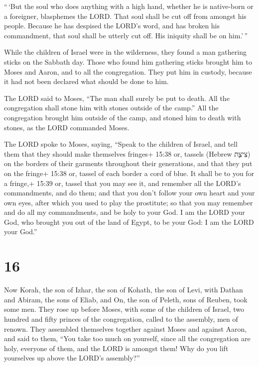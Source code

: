  ``\,`But the soul who does anything with a high hand,
whether he is native-born or a foreigner, blasphemes the LORD. That soul
shall be cut off from amongst his people.  Because he has
despised the LORD's word, and has broken his commandment, that soul
shall be utterly cut off. His iniquity shall be on him.'\,''

 While the children of Israel were in the wilderness, they
found a man gathering sticks on the Sabbath day.  Those who
found him gathering sticks brought him to Moses and Aaron, and to all
the congregation.  They put him in custody, because it had
not been declared what should be done to him.

 The LORD said to Moses, ``The man shall surely be put to
death. All the congregation shall stone him with stones outside of the
camp.''  All the congregation brought him outside of the
camp, and stoned him to death with stones, as the LORD commanded Moses.

 The LORD spoke to Moses, saying,  ``Speak to
the children of Israel, and tell them that they should make themselves
fringes+ 15:38 or, tassels (Hebrew צִיצִ֛ת) on the borders of their
garments throughout their generations, and that they put on the fringe+
15:38 or, tassel of each border a cord of blue.  It shall
be to you for a fringe,+ 15:39 or, tassel that you may see it, and
remember all the LORD's commandments, and do them; and that you don't
follow your own heart and your own eyes, after which you used to play
the prostitute;  so that you may remember and do all my
commandments, and be holy to your God.  I am the LORD your
God, who brought you out of the land of Egypt, to be your God: I am the
LORD your God.''

\hypertarget{section-15}{%
\section{16}\label{section-15}}

 Now Korah, the son of Izhar, the son of Kohath, the son of
Levi, with Dathan and Abiram, the sons of Eliab, and On, the son of
Peleth, sons of Reuben, took some men.  They rose up before
Moses, with some of the children of Israel, two hundred and fifty
princes of the congregation, called to the assembly, men of renown.
 They assembled themselves together against Moses and
against Aaron, and said to them, ``You take too much on yourself, since
all the congregation are holy, everyone of them, and the LORD is amongst
them! Why do you lift yourselves up above the LORD's assembly?''

